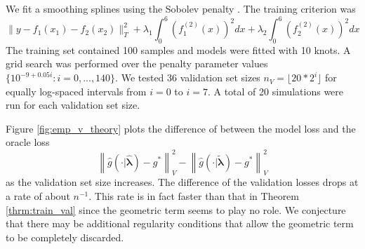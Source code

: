 \documentclass[12pt]{article}
\begin{document}
We fit a smoothing splines using the Sobolev penalty \citep{de1978practical, wahba1990spline, green1994nonparametric}. The training criterion was
\begin{equation}
\| y - f_1(x_1) - f_2(x_2) \|_T^2 + \lambda_1 \int_0^6 (f_1^{(2)}(x))^2 dx + \lambda_2 \int_0^6 (f_2^{(2)}(x))^2 dx
\end{equation}
The training set contained 100 samples and models were fitted with 10 knots. A grid search was performed over the penalty parameter values $\{10^{-9 + 0.05i}: i = 0, ..., 140 \}$. We tested 36 validation set sizes $n_V = \lfloor 20 * 2^{i} \rfloor$ for equally log-spaced intervals from $i = 0$ to $i = 7$. A total of 20 simulations were run for each validation set size.

Figure \ref{fig:emp_v_theory} plots the difference of between the model loss and the oracle loss
$$
\left \| \hat{g}(\cdot | \hat{\boldsymbol{\lambda}}) - g^* \right \|_V^2 - 
\left \| \hat{g}(\cdot | \tilde{\boldsymbol{\lambda}}) - g^* \right \|_V^2
$$
as the validation set size increases. The difference of the validation losses drops at a rate of about $n^{-1}$. This rate is in fact faster than that in Theorem \ref{thrm:train_val} since the geometric term seems to play no role. We conjecture that there may be additional regularity conditions that allow the geometric term to be completely discarded.

\end{document}
